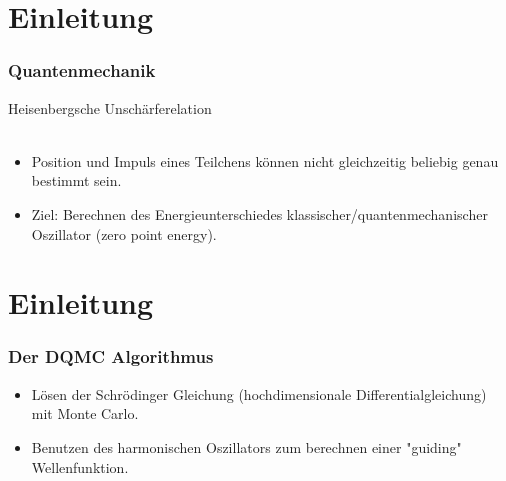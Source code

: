 \documentclass{beamer}
\begin{document}
\section{Einleitung}
\begin{frame}
\frametitle{Quantenmechanik}
\begin{center}
Heisenbergsche Unschärferelation\\
\medskip
{}\\ 

\smallskip
\end{center}
\begin{itemize}
\item Position und Impuls eines Teilchens können nicht gleichzeitig beliebig genau bestimmt sein.
\item Ziel: Berechnen des Energieunterschiedes klassischer/quantenmechanischer Oszillator (zero point energy).
\end{itemize}
\end{frame}

\section{Einleitung}
\begin{frame}
\frametitle{Der DQMC Algorithmus}
\begin{itemize}
\item Lösen der Schrödinger Gleichung (hochdimensionale Differentialgleichung) mit Monte Carlo.
\item Benutzen des harmonischen Oszillators zum berechnen einer "guiding"  Wellenfunktion.
\end{itemize}
\begin{center}
\\ 
\end{center}
\end{frame}
\end{document}
